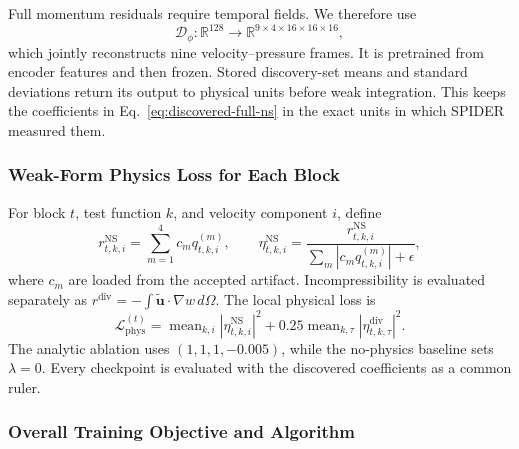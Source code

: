 \documentclass[preprint,12pt]{elsarticle}
\begin{document}
Full momentum residuals require temporal fields.  We therefore use
\begin{equation}
\mathcal D_\phi:\mathbb R^{128}\rightarrow
\mathbb R^{9\times4\times16\times16\times16},
\end{equation}
which jointly reconstructs nine velocity--pressure frames.  It is pretrained
from encoder features and then frozen. Stored discovery-set means and standard
deviations return its output to physical units before weak integration.  This
keeps the coefficients in Eq.~\eqref{eq:discovered-full-ns} in the exact units
in which SPIDER measured them.

\subsubsection{Weak-Form Physics Loss for Each Block}
\label{sec:weak-physics-loss}

For block $t$, test function $k$, and velocity component $i$, define
\begin{equation}
 r_{t,k,i}^{\mathrm{NS}}=\sum_{m=1}^{4}c_m q_{t,k,i}^{(m)},
 \qquad
 \eta_{t,k,i}^{\mathrm{NS}}=
 \frac{r_{t,k,i}^{\mathrm{NS}}}
 {\sum_m|c_mq_{t,k,i}^{(m)}|+\epsilon},
\label{eq:weak-ns-residual}
\end{equation}
where $c_m$ are loaded from the accepted artifact.  Incompressibility is
evaluated separately as
$r^{\mathrm{div}}=-\int\tilde{\mathbf u}\cdot\nabla w\,d\Omega$.
The local physical loss is
\begin{equation}
\label{eq:physics-loss}
\mathcal{L}_{\mathrm{phys}}^{(t)}=
\operatorname{mean}_{k,i}|\eta_{t,k,i}^{\mathrm{NS}}|^2
+0.25\operatorname{mean}_{k,\tau}|\eta_{t,k,\tau}^{\mathrm{div}}|^2.
\end{equation}
The analytic ablation uses $(1,1,1,-0.005)$, while the no-physics baseline
sets $\lambda=0$. Every checkpoint is evaluated with the discovered
coefficients as a common ruler.

\subsubsection{Overall Training Objective and Algorithm}
\label{sec:overall-objective}
\end{document}
